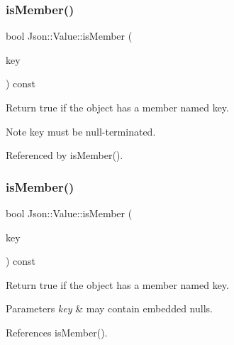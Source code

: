 \subsubsection{\texorpdfstring{is\+Member()}{isMember()}\hspace{0.1cm}{\footnotesize\ttfamily [1/3]}}
{\footnotesize\ttfamily bool Json\+::\+Value\+::is\+Member (\begin{DoxyParamCaption}\item[{const char $\ast$}]{key }\end{DoxyParamCaption}) const}

Return true if the object has a member named key. \begin{DoxyNote}{Note}
\textquotesingle{}key\textquotesingle{} must be null-\/terminated. 
\end{DoxyNote}


Referenced by is\+Member().

\mbox{\label{classJson_1_1Value_a0c2cd838217b23ee6bde8135de1b30d9_a0c2cd838217b23ee6bde8135de1b30d9}} 
\subsubsection{\texorpdfstring{is\+Member()}{isMember()}\hspace{0.1cm}{\footnotesize\ttfamily [2/3]}}
{\footnotesize\ttfamily bool Json\+::\+Value\+::is\+Member (\begin{DoxyParamCaption}\item[{const \hyperlink{json_8h_a1e723f95759de062585bc4a8fd3fa4be_a1e723f95759de062585bc4a8fd3fa4be}{J\+S\+O\+N\+C\+P\+P\+\_\+\+S\+T\+R\+I\+NG} \&}]{key }\end{DoxyParamCaption}) const}

Return true if the object has a member named key. 
\begin{DoxyParams}{Parameters}
{\em key} & may contain embedded nulls. \\
\hline
\end{DoxyParams}


References is\+Member().

\mbox{\label{classJson_1_1Value_a2007e1e51f21f44ecf1f13e4a1c567b9_a2007e1e51f21f44ecf1f13e4a1c567b9}} 
